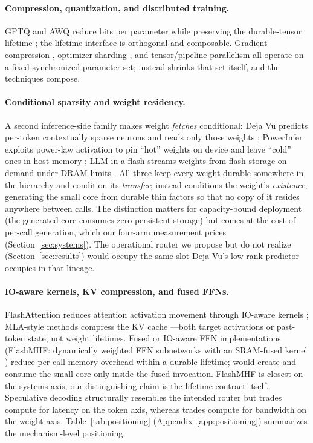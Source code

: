 \paragraph{Compression, quantization, and distributed training.}
GPTQ and AWQ reduce bits per parameter while preserving the
durable-tensor lifetime \cite{frantar2023gptq,lin2024awq}; the lifetime
interface is orthogonal and composable. Gradient compression
\cite{lin2018dgc,alistarh2017qsgd,vogels2019powersgd}, optimizer
sharding \cite{rajbhandari2020zero}, and tensor/pipeline parallelism
\cite{narayanan2021megatron,korthikanti2023megatron} all operate on a
fixed synchronized parameter set; \mwg{} instead shrinks that set
itself, and the techniques compose.

\paragraph{Conditional sparsity and weight residency.}
A second inference-side family makes weight \emph{fetches} conditional:
Deja Vu predicts per-token contextually sparse neurons and reads only
those weights \cite{liu2023dejavu}; PowerInfer exploits power-law
activation to pin ``hot'' weights on device and leave ``cold'' ones in
host memory \cite{song2024powerinfer}; LLM-in-a-flash streams weights
from flash storage on demand under DRAM limits
\cite{alizadeh2024llminflash}. All three keep every weight durable
somewhere in the hierarchy and condition its \emph{transfer}; \mwg{}
instead conditions the weight's \emph{existence}, generating the small
core from durable thin factors so that no copy of it resides anywhere
between calls. The distinction matters for capacity-bound deployment
(the generated core consumes zero persistent storage) but comes at the
cost of per-call generation, which our four-arm measurement prices
(Section~\ref{sec:systems}). The operational router we propose but do
not realize (Section~\ref{sec:results}) would occupy the same slot Deja
Vu's low-rank predictor occupies in that lineage.

\paragraph{IO-aware kernels, KV compression, and fused FFNs.}
FlashAttention reduces attention activation movement through IO-aware
kernels \cite{dao2022flashattention}; MLA-style methods compress the KV
cache \cite{deepseek2024v2}---both target activations or past-token
state, not weight lifetimes. Fused or IO-aware FFN implementations
(FlashMHF: dynamically weighted FFN subnetworks with an SRAM-fused
kernel \cite{zhang2025flashmhf}) reduce per-call memory overhead within
a durable lifetime; \mwg{} would create and consume the small core only
inside the fused invocation. FlashMHF is closest on the systems axis;
our distinguishing claim is the lifetime contract itself. Speculative
decoding \cite{leviathan2023speculative} structurally resembles the
intended router but trades compute for latency on the token axis,
whereas \mwg{} trades compute for bandwidth on the weight axis.
Table~\ref{tab:positioning} (Appendix~\ref{app:positioning}) summarizes
the mechanism-level positioning.
